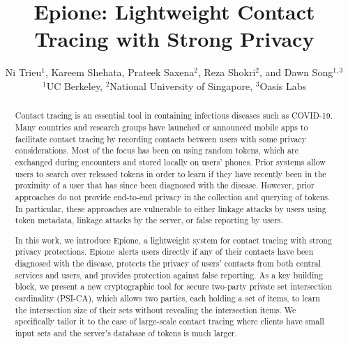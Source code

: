 \documentclass[11pt]{article} %
\newcommand{\dect}{\textsf{Epione}\xspace}
\begin{document}
\title{\dect: Lightweight  Contact Tracing with Strong Privacy}
	
\author{Ni Trieu$^1$, Kareem Shehata, Prateek Saxena$^2$, Reza Shokri$^2$, and Dawn Song$^{1,3}$ \\
$^1$UC Berkeley, $^2$National University of Singapore, $^3$Oasis Labs}


	
	

\maketitle 

\begin{abstract}
 Contact tracing is an essential tool in containing infectious diseases such as COVID-19. Many countries and research groups have launched or announced mobile apps to facilitate contact tracing by recording contacts between users with some privacy considerations.  Most of the focus has been on using random tokens, which are exchanged during encounters and stored locally on users' phones. Prior systems allow users to search over released tokens in order to learn if they have recently been in the proximity of a user that has since been diagnosed with the disease.  However, prior approaches do not provide end-to-end privacy in the collection and querying of tokens. In particular, these approaches are vulnerable to either linkage attacks by users using token metadata, linkage attacks by the server, or false reporting by users.

In this work, we introduce \dect, a lightweight system for contact tracing with strong privacy protections. \dect\ alerts users directly if any of their contacts have been diagnosed with the disease, protects the privacy of users' contacts from both central services and users, and provides protection against false reporting. As a key building block, we present a new cryptographic tool for secure two-party private set intersection cardinality (PSI-CA), which allows two parties, each holding a set of items, to learn the intersection size of their sets without revealing the intersection items. We specifically tailor it to the case of large-scale contact tracing where clients have small input sets and the server's database of tokens is much larger. 
\end{abstract}
\end{document}

